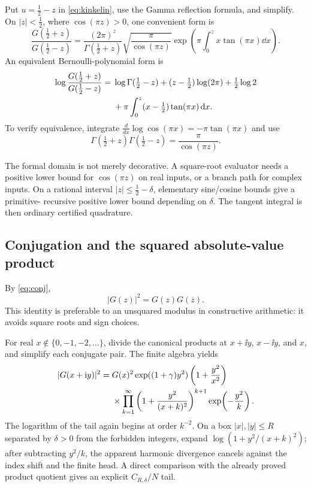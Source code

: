 Put \(u=\tfrac12-z\) in \cref{eq:kinkelin}, use the Gamma reflection formula,
and simplify.  On \(|z|<\tfrac12\), where \(\cos(\pi z)>0\), one convenient
form is
\begin{equation}\label{eq:halfshift}
 \frac{G(\frac12+z)}{G(\frac12-z)}
 =\frac{(2\pi)^z}{\Gamma(\frac12+z)}
  \sqrt{\frac{\pi}{\cos(\pi z)}}
  \exp\!\left(\pi\int_0^z x\tan(\pi x)\dd x\right).
\end{equation}
An equivalent Bernoulli-polynomial form is
\begin{align}
 \log\frac{G(\frac12+z)}{G(\frac12-z)}
 ={}&\log\Gamma(\tfrac12-z)
 +(z-\tfrac12)\log(2\pi)+\tfrac12\log2\notag\\
 &+\pi\int_0^z(x-\tfrac12)\tan(\pi x)\,\mathrm d x.
 \label{eq:halfshift-B1}
\end{align}
To verify equivalence, integrate
\(\frac{d}{dx}\log\cos(\pi x)=-\pi\tan(\pi x)\) and use
\[
 \Gamma(\tfrac12+z)\Gamma(\tfrac12-z)=\frac{\pi}{\cos(\pi z)}.
\]

The formal domain is not merely decorative.  A square-root evaluator needs a
positive lower bound for \(\cos(\pi z)\) on real inputs, or a branch path for
complex inputs.  On a rational interval
\(|z|\le\tfrac12-\delta\), elementary sine/cosine bounds give a primitive-
recursive positive lower bound depending on \(\delta\).  The tangent integral
is then ordinary certified quadrature.

\subsection{Conjugation and the squared absolute-value product}\label{sec:modulus}

By \cref{eq:conj},
\begin{equation}\label{eq:modsquare-basic}
 |G(z)|^2=G(z)G(\overline z).
\end{equation}
This identity is preferable to an unsquared modulus in constructive arithmetic:
it avoids square roots and sign choices.

For real \(x\notin\{0,-1,-2,\ldots\}\), divide the canonical products at
\(x+\ii y\), \(x-\ii y\), and \(x\), and simplify each conjugate pair.  The
finite algebra yields
\begin{align}
 |G(x+\mathrm i y)|^2
 ={}&G(x)^2\exp((1+\gamma)y^2)
 \left(1+\frac{y^2}{x^2}\right)\notag\\
 &\times\prod_{k=1}^{\infty}
 \left(1+\frac{y^2}{(x+k)^2}\right)^{k+1}
 \exp\!\left(-\frac{y^2}{k}\right).
 \label{eq:modsquare}
\end{align}
The logarithm of the tail again begins at order \(k^{-2}\).  On a box
\(|x|,|y|\le R\) separated by \(\delta>0\) from the forbidden integers, expand
\(\log(1+y^2/(x+k)^2)\); after subtracting \(y^2/k\), the apparent harmonic
divergence cancels against the index shift and the finite head.  A direct
comparison with the already proved product quotient gives an explicit
\(C_{R,\delta}/N\) tail.

